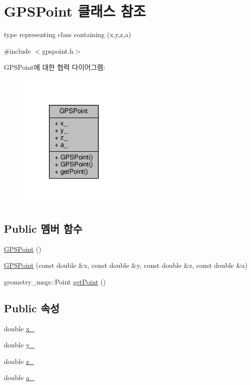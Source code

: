 \hypertarget{class_g_p_s_point}{}\section{G\+P\+S\+Point 클래스 참조}
\label{class_g_p_s_point}


type representing class containing (x,y,z,a)  




{\ttfamily \#include $<$gpspoint.\+h$>$}



G\+P\+S\+Point에 대한 협력 다이어그램\+:\nopagebreak
\begin{figure}[H]
\begin{center}
\leavevmode
\includegraphics[width=155pt]{class_g_p_s_point__coll__graph}
\end{center}
\end{figure}
\subsection*{Public 멤버 함수}
\begin{DoxyCompactItemize}
\item 
\hyperlink{class_g_p_s_point_a7a635f12f124e516210755b0974ee1d4}{G\+P\+S\+Point} ()
\item 
\hyperlink{class_g_p_s_point_aab0d3a5aaee6586b615f55a82c17a10d}{G\+P\+S\+Point} (const double \&x, const double \&y, const double \&z, const double \&a)
\item 
geometry\+\_\+msgs\+::\+Point \hyperlink{class_g_p_s_point_aa02789544161ef0bcc40a24972f1b365}{get\+Point} ()
\end{DoxyCompactItemize}
\subsection*{Public 속성}
\begin{DoxyCompactItemize}
\item 
double \hyperlink{class_g_p_s_point_ad4b7325afe1ca0fcf8d2ef284ab9b62c}{x\+\_\+}
\item 
double \hyperlink{class_g_p_s_point_ad41d0e7a93f8766181402ce25af798fe}{y\+\_\+}
\item 
double \hyperlink{class_g_p_s_point_aa6622ef5c0c58fa1b59c1d5b77fe020c}{z\+\_\+}
\item 
double \hyperlink{class_g_p_s_point_ac4652d53d65aeb605f7eb35128a5ab90}{a\+\_\+}
\end{DoxyCompactItemize}


